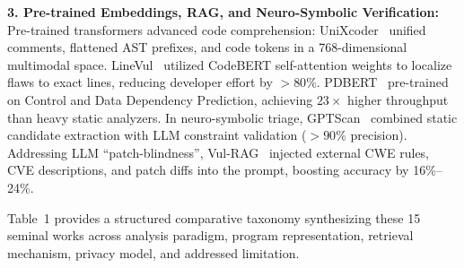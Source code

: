 \documentclass[10pt,twocolumn]{article}
\begin{document}
\vspace{2pt}\noindent\textbf{3. Pre-trained Embeddings, RAG, and Neuro-Symbolic Verification:}
Pre-trained transformers advanced code comprehension: UniXcoder~\cite{guo2022unixcoder} unified comments, flattened AST prefixes, and code tokens in a 768-dimensional multimodal space. LineVul~\cite{fu2022linevul} utilized CodeBERT self-attention weights to localize flaws to exact lines, reducing developer effort by $>80\%$. PDBERT~\cite{liu2024pdbert} pre-trained on Control and Data Dependency Prediction, achieving $23\times$ higher throughput than heavy static analyzers. In neuro-symbolic triage, GPTScan~\cite{sun2024gptscan} combined static candidate extraction with LLM constraint validation ($>90\%$ precision). Addressing LLM ``patch-blindness'', Vul-RAG~\cite{du2024vulrag} injected external CWE rules, CVE descriptions, and patch diffs into the prompt, boosting accuracy by 16\%--24\%.

Table~1 provides a structured comparative taxonomy synthesizing these 15 seminal works across analysis paradigm, program representation, retrieval mechanism, privacy model, and addressed limitation.
\end{document}
